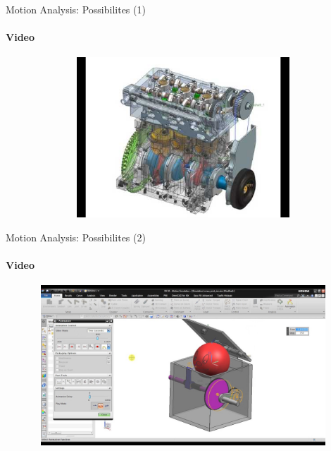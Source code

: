 \documentclass[aspectratio=169]{beamer}
\begin{document}
\begin{frame}[t]{Motion Analysis: Possibilites (1)}
    \framesubtitle{Video}
    \vspace{-0.6cm}
    \begin{figure}[H]
        \href{https://www.youtube.com/watch?v=biMRRdMpJno}{
            \centering\includegraphics[height=6cm,width=1\textwidth,keepaspectratio]{motion_video1_preview.jpg}}
        \label{fig:motion_video1_preview.jpg}
    \end{figure}
\end{frame}

\begin{frame}[t]{Motion Analysis: Possibilites (2)}
    \framesubtitle{Video}
    \vspace{-0.6cm}
    \begin{figure}[H]
        \href{https://youtu.be/p_bHL19dTRY}{
            \centering\includegraphics[height=6cm,width=1\textwidth,keepaspectratio]{motion_video2_preview.jpg}}
        \label{fig:motion_video2_preview.jpg}
    \end{figure}
\end{frame}
\end{document}
